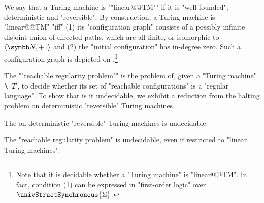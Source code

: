We say that a Turing machine is ""linear@@TM"" if it is "well-founded", deterministic and "reversible".
By construction, a Turing machine is "linear@@TM" "iff" (1) its "configuration graph" consists of a possibly infinite disjoint union of directed paths, which are all finite, or isomorphic to $\tup{\N, +1}$ and (2) the "initial configuration" has in-degree zero.
Such a configuration graph is depicted on
.\footnote{Note
that it is decidable whether a "Turing machine" is "linear@@TM". In fact, condition (1) can be expressed in "first-order logic" over $\univStructSynchronous{\Sigma}$.}

\AP The ""reachable regularity problem"" is the problem of, given a "Turing machine" $\+T$, to decide whether its set of "reachable configurations" is a "regular language". To show that is it undecidable, we exhibit a reduction from the halting problem on deterministic "reversible" Turing machines.

\begin{proposition}
    \AP\label{prop:halting-problem-detrevTM}
    The  on deterministic "reversible" Turing machines is undecidable.
\end{proposition}

\begin{lemma}
    \AP\label{lem:reachable-regularity}
    The "reachable regularity problem" is undecidable, even if restricted
    to "linear Turing machines".
\end{lemma}

